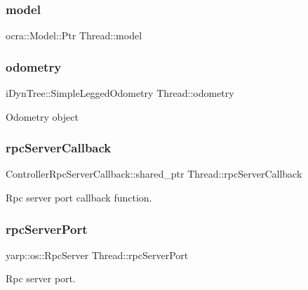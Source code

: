 \subsubsection{\texorpdfstring{model}{model}}
{\footnotesize\ttfamily ocra\+::\+Model\+::\+Ptr Thread\+::model\hspace{0.3cm}{\ttfamily [private]}}

\hypertarget{classThread_a23a41c6ccd1df898084112cfd46120f3}{}\label{classThread_a23a41c6ccd1df898084112cfd46120f3} 
\subsubsection{\texorpdfstring{odometry}{odometry}}
{\footnotesize\ttfamily i\+Dyn\+Tree\+::\+Simple\+Legged\+Odometry Thread\+::odometry\hspace{0.3cm}{\ttfamily [private]}}

Odometry object \hypertarget{classThread_a602de8d12886c9c57b5420c83804a38b}{}\label{classThread_a602de8d12886c9c57b5420c83804a38b} 
\subsubsection{\texorpdfstring{rpc\+Server\+Callback}{rpcServerCallback}}
{\footnotesize\ttfamily Controller\+Rpc\+Server\+Callback\+::shared\+\_\+ptr Thread\+::rpc\+Server\+Callback\hspace{0.3cm}{\ttfamily [private]}}

Rpc server port callback function. \hypertarget{classThread_adbec1b4f2c8fc40641df6f118e93fd25}{}\label{classThread_adbec1b4f2c8fc40641df6f118e93fd25} 
\subsubsection{\texorpdfstring{rpc\+Server\+Port}{rpcServerPort}}
{\footnotesize\ttfamily yarp\+::os\+::\+Rpc\+Server Thread\+::rpc\+Server\+Port\hspace{0.3cm}{\ttfamily [private]}}

Rpc server port. \hypertarget{classThread_a5e864394c4bd0fbdf3cba7f6f825e17d}{}\label{classThread_a5e864394c4bd0fbdf3cba7f6f825e17d} 
